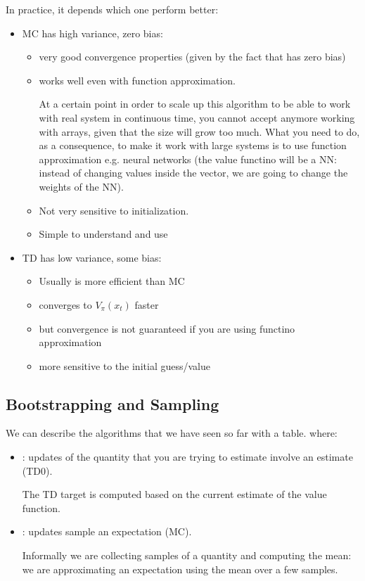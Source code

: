 In practice, it depends which one perform better:
\begin{itemize}
\item MC has high variance, zero bias:
\begin{itemize}
\item very good convergence properties (given by the fact that has zero bias)
\item works well even with function approximation.

At a certain point in order to scale up this algorithm to be able to work with real system in continuous time, you cannot accept anymore working with arrays, given that the size will grow too much. What you need to do, as a consequence, to make it work with large systems is to use function approximation e.g. neural networks (the value functino will be a NN: instead of changing values inside the vector, we are going to change the weights of the NN).
\item Not very sensitive to initialization.
\item Simple to understand and use
\end{itemize}
\item TD has low variance, some bias:
\begin{itemize}
\item Usually is more efficient than MC
\item converges to $V_{\pi}(x_t)$ faster
\item but convergence is not guaranteed if you are using functino approximation
\item more sensitive to the initial guess/value
\end{itemize}
\end{itemize}


\subsection{Bootstrapping and Sampling}

We can describe the algorithms that we have seen so far with a table.
where:
\begin{itemize}
\item {}: updates of the quantity that you are trying to estimate involve an estimate (TD0).

The TD target is computed based on the current estimate of the value function.
\item {}: updates sample an expectation (MC).

Informally we are collecting samples of a quantity and computing the mean: we are approximating an expectation using the mean over a few samples.
\end{itemize}

